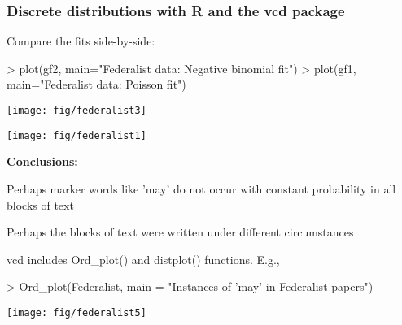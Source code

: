 \begin{frame}[fragile]
  \frametitle{Discrete distributions with R and the vcd package}

Compare the fits side-by-side:
\begin{Rin}
> plot(gf2, main="Federalist data: Negative binomial fit")
> plot(gf1, main="Federalist data: Poisson fit")
\end{Rin}
 \begin{minipage}[b]{.5\linewidth}
  \centering
  \texttt{[image: fig/federalist3]}
 \end{minipage}%
 \begin{minipage}[b]{.5\linewidth}
  \centering
  \texttt{[image: fig/federalist1]}
 \end{minipage}

{\large\bfseries Conclusions:}
\begin{itemize*}
  \item Perhaps marker words like 'may' do not occur with constant probability in all
  blocks of text
  \item Perhaps the blocks of text were written under different circumstances
\end{itemize*}

\begin{comment}
> # geometric = NBin (1,p)
> gf3 <- goodfit(Federalist, type = "nbinomial", par = list(size = 1))
> summary(gf3)

\begin{Rout}
         Goodness-of-fit test for nbinomial distribution

                      X^2 df  P(> X^2)
Likelihood Ratio 2.294143  5 0.8071267
\end{Rout}
> plot(gf3, main="Federalist data: Geometric distribution, NBin(1,p)")
\end{comment}

\end{frame}

\begin{frame}[fragile]
vcd includes Ord\_plot() and distplot() functions. E.g.,
\begin{Rin}
> Ord_plot(Federalist, 
       main = "Instances of 'may' in Federalist papers")
\end{Rin}
  \begin{center}
        \texttt{[image: fig/federalist5]}
  \end{center}

\end{frame}

